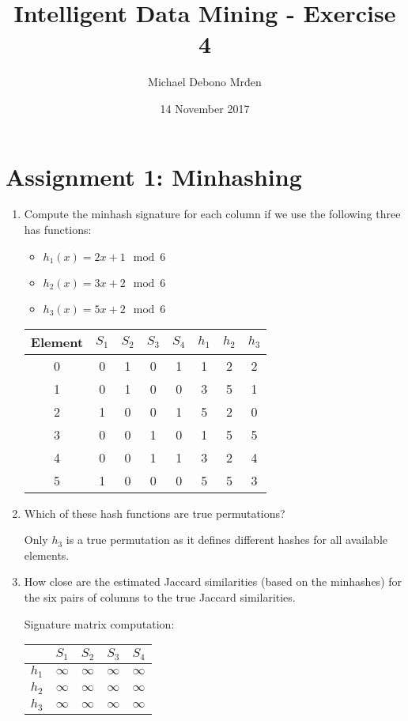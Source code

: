 \documentclass{article}
\title{Intelligent Data Mining - Exercise 4}
\author{\fontencoding{T1}\selectfont Michael Debono Mrđen}
\date{14 November 2017}
\begin{document}
\maketitle

\section{Assignment 1: Minhashing}
\renewcommand{\labelenumi}{\alph{enumi}.}
\renewcommand{\labelenumii}{(\alph{enumii})}

\begin{enumerate}
\item{Compute the minhash signature for each column if we use the following three has functions:
	\begin{itemize}
		\item $h_1(x)=2x+1\mod{6}$
		\item $h_2(x)=3x+2\mod{6}$
		\item $h_3(x)=5x+2\mod{6}$
	\end{itemize}

\begin{center}
\begin{tabular}{ c | c | c | c | c || c | c | c}
	Element & $S_1$ & $S_2$ & $S_3$ & $S_4$ & $h_1$ & $h_2$ & $h_3$ \\ \hline\hline
	0       & 0     & 1     & 0     & 1     & 1        & 2        & 2        \\
	1       & 0     & 1     & 0     & 0     & 3        & 5        & 1        \\
	2       & 1     & 0     & 0     & 1     & 5        & 2        & 0        \\
	3       & 0     & 0     & 1     & 0     & 1        & 5        & 5        \\
	4       & 0     & 0     & 1     & 1     & 3        & 2        & 4        \\
	5       & 1     & 0     & 0     & 0     & 5        & 5        & 3
\end{tabular}
\end{center}
	
}
\item{Which of these hash functions are true permutations?
	
Only $h_3$ is a true permutation as it defines different hashes for all available elements.
}
\item{How close are the estimated Jaccard similarities (based on the minhashes) for the six pairs of columns to the true Jaccard similarities.

Signature matrix computation:
\begin{center}
	\begin{tabular}{ c || c | c | c | c }
		      & $S_1$    & $S_2$    & $S_3$    & $S_4$    \\ \hline
		$h_1$ & $\infty$ & $\infty$ & $\infty$ & $\infty$ \\
		$h_2$ & $\infty$ & $\infty$ & $\infty$ & $\infty$ \\
		$h_3$ & $\infty$ & $\infty$ & $\infty$ & $\infty$
	\end{tabular}
\end{center}

}
\end{enumerate}
\end{document}
